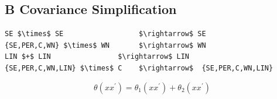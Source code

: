 \documentclass{article} %
\begin{document}
\subsection*{B Covariance Simplification}

\begin{minipage}{\linewidth}
\begin{lstlisting}[frame=single,label=alg:simplify,caption=Grammar to simplify expressions,mathescape]
SE $\times$ SE                  $\rightarrow$ SE 
{SE,PER,C,WN} $\times$ WN       $\rightarrow$ WN
LIN $+$ LIN                $\rightarrow$ LIN
{SE,PER,C,WN,LIN} $\times$ C    $\rightarrow$  {SE,PER,C,WN,LIN} 
\end{lstlisting}

\end{minipage}
\begin{equation}
 \theta (x x^\prime) = \theta_1 (x x^\prime) + \theta_2 (x x^\prime) 
\end{equation}

\newpage


\end{document}
